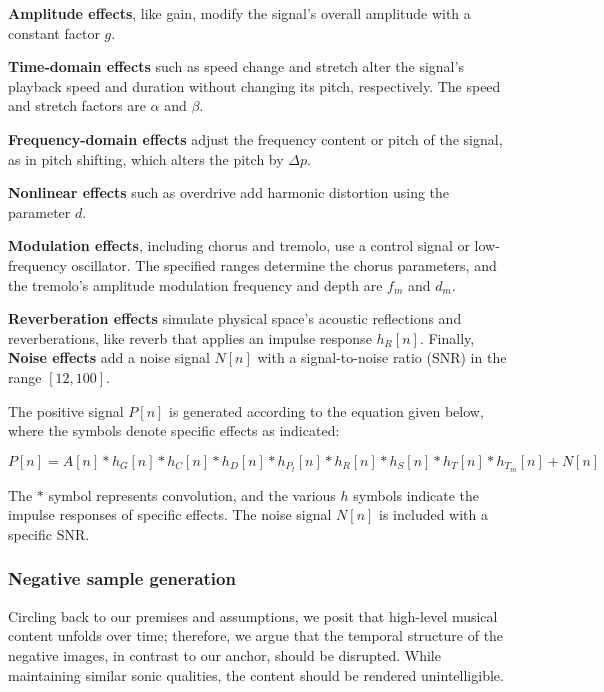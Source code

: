 \textbf{Amplitude effects}, like gain, modify the signal's overall amplitude with a constant factor $g$. 

\textbf{Time-domain effects} such as speed change and stretch alter the signal's playback speed and duration without changing its pitch, respectively. The speed and stretch factors are $\alpha$ and $\beta$.

\textbf{Frequency-domain effects} adjust the frequency content or pitch of the signal, as in pitch shifting, which alters the pitch by $\Delta p$. 

\textbf{Nonlinear effects} such as overdrive add harmonic distortion using the parameter $d$.

\textbf{Modulation effects}, including chorus and tremolo, use a control signal or low-frequency oscillator. The specified ranges determine the chorus parameters, and the tremolo's amplitude modulation frequency and depth are $f_m$ and $d_m$.

\textbf{Reverberation effects} simulate physical space's acoustic reflections and reverberations, like reverb that applies an impulse response $h_R[n]$. Finally, \textbf{Noise effects} add a noise signal $N[n]$ with a signal-to-noise ratio (SNR) in the range $[12, 100]$.

The positive signal $P[n]$ is generated according to the equation given below, where the symbols denote specific effects as indicated:

\begin{equation}\label{eq:positive_signal}
P[n] = A[n] \ast h_{G}[n] \ast h_{C}[n] \ast h_{D}[n] \ast h_{P_t}[n] \ast h_{R}[n] \ast h_{S}[n] \ast h_{T}[n] \ast h_{T_m}[n] + N[n]
\end{equation}

The $\ast$ symbol represents convolution, and the various $h$ symbols indicate the impulse responses of specific effects. The noise signal $N[n]$ is included with a specific SNR.

\subsubsection{Negative sample generation}

Circling back to our premises and assumptions, we posit that high-level musical content unfolds over time; therefore, we argue that the temporal structure of the negative images, in contrast to our anchor, should be disrupted. While maintaining similar sonic qualities, the content should be rendered unintelligible.

